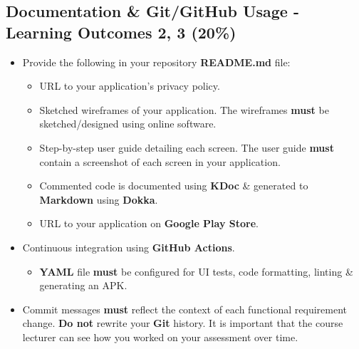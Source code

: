 \documentclass{article}
\begin{document}
\subsection*{Documentation \& Git/GitHub Usage - Learning Outcomes 2, 3 (20\%)}
\begin{itemize}
	\item Provide the following in your repository \textbf{README.md} file:
	      \begin{itemize}
	      	\item URL to your application's privacy policy.
	      	\item Sketched wireframes of your application. The wireframes \textbf{must} be sketched/designed using online software. 
	      	\item Step-by-step user guide detailing each screen. The user guide \textbf{must} contain a screenshot of each screen in your application.
	      	\item Commented code is documented using \textbf{KDoc} \& generated to \textbf{Markdown} using \textbf{Dokka}.
	      	\item URL to your application on \textbf{Google Play Store}.
	      \end{itemize}
	\item Continuous integration using \textbf{GitHub Actions}.
	      \begin{itemize}
	      	\item \textbf{YAML} file \textbf{must} be configured for UI tests, code formatting, linting \& generating an APK.
	      \end{itemize}  			
	\item Commit messages \textbf{must} reflect the context of each functional requirement change. \textbf{Do not} rewrite your \textbf{Git} history. It is important that the course lecturer can see how you worked on your assessment over time.
\end{itemize}
\end{document}
